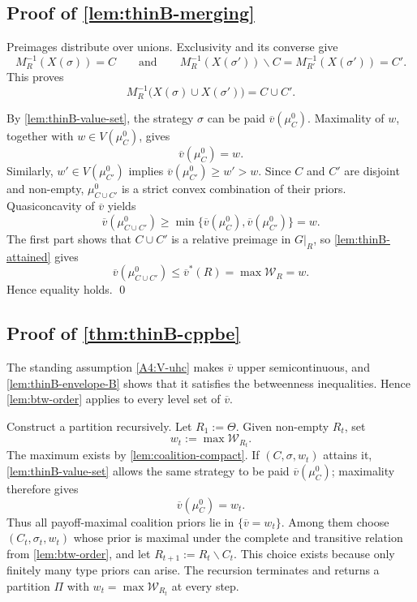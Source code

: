 \documentclass[11pt]{article}
\newcommand{\W}{\mathcal{W}}
\begin{document}
\subsection*{Proof of \cref{lem:thinB-merging}}
Preimages distribute over unions. Exclusivity and its converse give
\[
    M^{-1}_R(X(\sigma))=C
    \qquad\text{and}\qquad
    M^{-1}_R(X(\sigma'))\smallsetminus C
    =
    M^{-1}_{R'}(X(\sigma'))
    =
    C'.
\]
This proves
\[
    M^{-1}_R\bigl(X(\sigma)\cup X(\sigma')\bigr)=C\cup C'.
\]

By \cref{lem:thinB-value-set}, the strategy $\sigma$ can be paid $\overline v(\mu^0_C)$. Maximality of $w$, together with $w\in V(\mu^0_C)$, gives
\[
    \overline v(\mu^0_C)=w.
\]
Similarly, $w'\in V(\mu^0_{C'})$ implies $\overline v(\mu^0_{C'})\geq w'>w$. Since $C$ and $C'$ are disjoint and non-empty, $\mu^0_{C\cup C'}$ is a strict convex combination of their priors. Quasiconcavity of $\overline v$ yields
\[
    \overline v(\mu^0_{C\cup C'})
    \geq
    \min\{\overline v(\mu^0_C),\overline v(\mu^0_{C'})\}
    =
    w.
\]
The first part shows that $C\cup C'$ is a relative preimage in $G\vert_R$, so \cref{lem:thinB-attained} gives
\[
    \overline v(\mu^0_{C\cup C'})
    \leq
    \overline v^*(R)
    =
    \max\W_R
    =
    w.
\]
Hence equality holds. \qed

\subsection*{Proof of \cref{thm:thinB-cppbe}}
The standing assumption \cref{A4:V-uhc} makes $\overline v$ upper semicontinuous, and \cref{lem:thinB-envelope-B} shows that it satisfies the betweenness inequalities. Hence \cref{lem:btw-order} applies to every level set of $\overline v$.

Construct a partition recursively. Let $R_1:=\Theta$. Given non-empty $R_t$, set
\[
    w_t:=\max\W_{R_t}.
\]
The maximum exists by \cref{lem:coalition-compact}. If $(C,\sigma,w_t)$ attains it, \cref{lem:thinB-value-set} allows the same strategy to be paid $\overline v(\mu^0_C)$; maximality therefore gives
\[
    \overline v(\mu^0_C)=w_t.
\]
Thus all payoff-maximal coalition priors lie in $\{\overline v=w_t\}$. Among them choose $(C_t,\sigma_t,w_t)$ whose prior is maximal under the complete and transitive relation from \cref{lem:btw-order}, and let $R_{t+1}:=R_t\smallsetminus C_t$. This choice exists because only finitely many type priors can arise. The recursion terminates and returns a partition $\Pi$ with $w_t=\max\W_{R_t}$ at every step.
\end{document}
